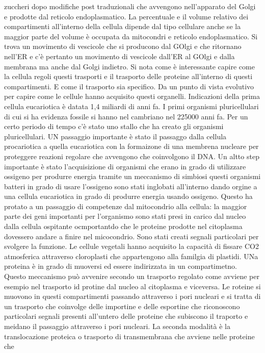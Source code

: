 zuccheri dopo modifiche post traduzionali che avvengono nell'apparato del Golgi e prodotte dal reticolo endoplasmatico. La percentuale e il volume relativo dei compartimenti all'interno
della cellula dipende dal tipo cellulare anche se la maggior parte del volume \`e occupata da mitocondri e reticolo endoplasmatico. Si trova un movimento di vescicole che si producono
dal GOlgi e che ritornano nell'ER e c'\`e pertanto un movimento di vescicole dall'ER al GOlgi e dalla membrana ma anche dal Golgi indietro. Si nota come \`e interessante capire come
la cellula regoli questi trasporti e il trasporto delle proteine all'interno di questi compartimenti. E come il trasporto sia specifico. Da un punto di vista evolutivo per capire come
le cellule hanno acquisito questi organelli. Indicazioni della prima cellula eucariotica \`e datata 1,4 miliardi di anni fa. I primi organismi pluricellulari di cui si ha evidenza 
fossile si hanno nel cambriano nel 225000 anni fa. Per un certo periodo di tempo c'\`e stato uno stallo che ha creato gli organismi pluricellulari. UN passaggio importante \`e stato 
il passaggo dalla cellula procariotica a quella eucariotica con la formaizone di una membrena nucleare per proteggere reazioni regolare che avvengono che coinvolgono il DNA. Un altto 
step importante \`e stato l'acquisizione di organismi che erano in grado di utilizzare ossigeno per produrre energia tramite un meccanismo di simbiosi questi organismi batteri in grado 
di usare l'ossigeno sono stati inglobati all'interno dando orgine a una cellula eucariotica in grado di produrre energia usando ossigeno. Questo ha protato a un passaggio di competenze
dal mitocondrio alla cellula: la maggior parte dei geni importanti per l'organismo sono stati presi in carico dal nucleo dalla cellula ospitante ocmportantdo che le proteine prodotte nel
citoplasma dovessero andare a finire nel micocondrio. Sono stati creati segnali particolari per svolgere la funzione. Le cellule vegetali hanno acquisito la capacit\`a di fissare CO2 
atmosferica attraverso cloroplasti che appartengono alla familgia di plastidi. UNa proteina \`e in grado di muoversi ed essere indirizzata in un compartimetno. Questo meccanismo pu\`o 
avvenire secondo un trasporto regolato come avviene per esempio nel trasporto id protine dal nucleo al citoplasma e viceversa. Le roteine si muovono in questi compartimenti passando 
attraverso i pori nucleari e si tratta di un trasporto che coinvolge delle importine e delle esportine che riconoscono particolari segnali presenti all'untero delle proteine che 
subiscono il traporto e meidano il passaggio attraverso i pori nucleari. La seconda modalit\`a \`e la translocazione proteica o trasporto di transmembrana che avviene nelle proteine che
